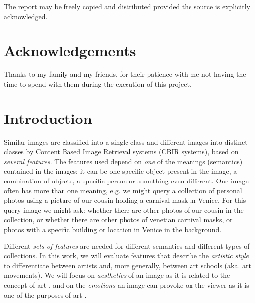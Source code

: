\documentclass[11pt,a4paper,twoside,openright]{report}
\begin{document}
The report may be freely copied and distributed provided the source is
explicitly acknowledged.

\newpage
\null
\thispagestyle{empty}
\newpage

\newpage
{}
{}
\chapter*{Acknowledgements}
Thanks to my family and my friends, for their patience with me not having the
time to spend with them during the execution of this project.

\newpage
\null
\thispagestyle{empty}
\newpage

\newpage
\setcounter{page}{1}

\clearpage{\pagestyle{empty}\cleardoublepage}
\chapter{Introduction}

Similar images are classified into a single class and different images into
distinct classes by Content Based Image Retrieval systems (CBIR systems), based
on \emph{several features}.  The features used depend on \emph{one} of the
meanings (semantics) contained in the images: it can be one specific object
present in the image, a combination of objects, a specific person or something
even different.  One image often has more than one meaning, e.g. we might query
a collection of personal photos using a picture of our cousin holding a
carnival mask in Venice.  For this query image we might ask: whether there are
other photos of our cousin in the collection, or whether there are other photos
of venetian carnival masks, or photos with a specific building or location in
Venice in the background.

Different \emph{sets of features} are needed for different semantics and
different types of collections.  In this work, we will evaluate features that
describe the \emph{artistic style} to differentiate between artists and, more
generally, between art schools (aka. art movements).  We will focus on
\emph{aesthetics} of an image as it is related to the concept of art
\cite{rmc12ajs}, and on the \emph{emotions} an image can provoke on the viewer
as it is one of the purposes of art \cite{mach10clas}.
\end{document}
